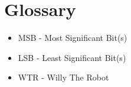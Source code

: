\section{Glossary}

\begin{itemize}
\item \label{trm::MSB} MSB  - Most Significant Bit(s)
\item \label{trm::LSB} LSB  - Least Significant Bit(s)
\item \label{trm::WTR} WTR  - Willy The Robot
\end{itemize}